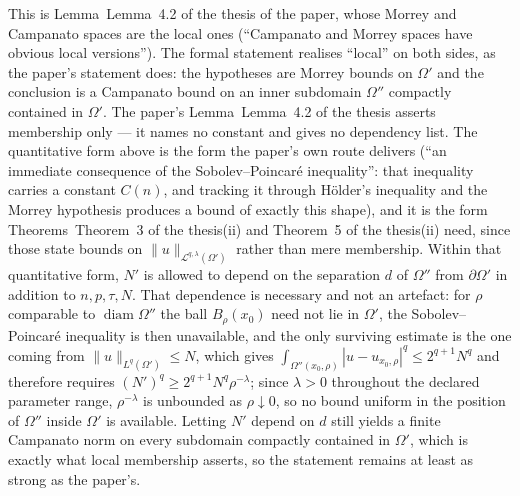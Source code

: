 \begin{lemma}[Lemma 4.2]
This is Lemma~Lemma~4.2 of the thesis of the paper, whose Morrey and Campanato spaces are
the local ones (``Campanato and Morrey spaces have obvious local versions'').
The formal statement realises ``local'' on both sides, as the paper's statement
does: the hypotheses are Morrey bounds on $\Omega'$ and the conclusion is a
Campanato bound on an inner subdomain $\Omega''$ compactly contained in
$\Omega'$.  The paper's Lemma~Lemma~4.2 of the thesis asserts membership only --- it names
no constant and gives no dependency list.  The quantitative form above is the
form the paper's own route delivers (``an immediate consequence of the
Sobolev--Poincar\'e inequality'': that inequality carries a constant $C(n)$, and
tracking it through H\"older's inequality and the Morrey hypothesis produces a
bound of exactly this shape), and it is the form Theorems~Theorem~3 of the thesis(ii) and
Theorem~5 of the thesis(ii) need, since those state bounds on
$\|u\|_{\mathcal L^{q,\lambda}(\Omega')}$ rather than mere membership.  Within
that quantitative form, $N'$ is allowed to depend on the separation $d$ of
$\Omega''$ from $\partial\Omega'$ in addition to $n,p,\tau,N$.  That dependence is necessary and not an artefact: for
$\rho$ comparable to $\operatorname{diam}\Omega''$ the ball $B_\rho(x_0)$ need
not lie in $\Omega'$, the Sobolev--Poincar\'e inequality is then unavailable, and
the only surviving estimate is the one coming from $\|u\|_{L^q(\Omega')}\le N$,
which gives $\int_{\Omega''(x_0,\rho)}|u-u_{x_0,\rho}|^q\le 2^{q+1}N^q$ and
therefore requires $(N')^q\ge2^{q+1}N^q\rho^{-\lambda}$; since $\lambda>0$
throughout the declared parameter range, $\rho^{-\lambda}$ is unbounded as
$\rho\downarrow0$, so no bound uniform in the position of $\Omega''$ inside
$\Omega'$ is available.  Letting $N'$ depend on $d$ still yields a finite
Campanato norm on every subdomain compactly contained in $\Omega'$, which is
exactly what local membership asserts, so the statement remains at least as
strong as the paper's.
\end{lemma}
